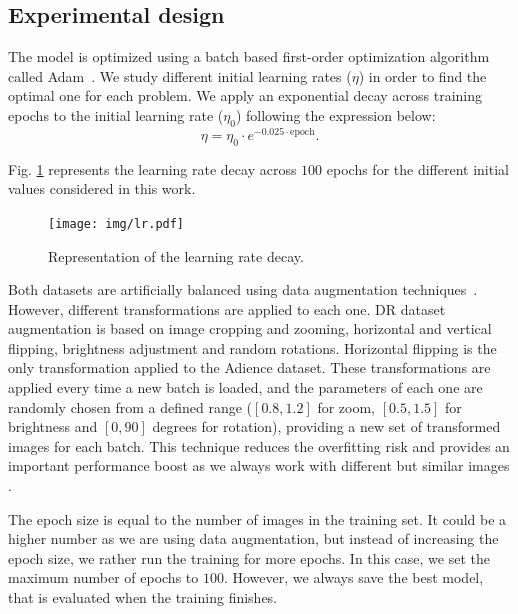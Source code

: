 \documentclass[journal]{IEEEtran}
\begin{document}
	\subsection{Experimental design}
	\label{sect:settings}
	The model is optimized using a batch based first-order optimization algorithm called Adam~\cite{kingma2014adam}. We study different initial learning rates ($\eta$) in order to find the optimal one for each problem. We apply an exponential decay \cite{chin2015learning} across training epochs to the initial learning rate ($\eta_0$) following the expression below:
	\begin{equation}
		\nonumber
		\eta = \eta_0 \cdot e^{-0.025 \cdot \text{epoch}}.
	\end{equation}
	
	Fig. \ref{fig:lrdecay} represents the learning rate decay across $100$ epochs for the different initial values considered in this work.
	\begin{figure}[!t]
		\centering
		\texttt{[image: img/lr.pdf]}
		\caption{Representation of the learning rate decay.}
		\label{fig:lrdecay}
	\end{figure}
	
	Both datasets are artificially balanced using data augmentation techniques~\cite{van2001art}. However, different transformations are applied to each one. DR dataset augmentation is based on image cropping and zooming, horizontal and vertical flipping, brightness adjustment and random rotations. Horizontal flipping is the only transformation applied to the Adience dataset. These transformations are applied every time a new batch is loaded, and the parameters of each one are randomly chosen from a defined range ($[0.8, 1.2]$ for zoom, $[0.5, 1.5]$ for brightness and $[0, 90]$ degrees for rotation), providing a new set of transformed images for each batch. This technique reduces the overfitting risk and provides an important performance boost as we always work with different but similar images \cite{krizhevsky2012imagenet}.
	
	The epoch size is equal to the number of images in the training set. It could be a higher number as we are using data augmentation, but instead of increasing the epoch size, we rather run the training for more epochs. In this case, we set the maximum number of epochs to $100$. However, we always save the best model, that is evaluated when the training finishes.
	
\end{document}
